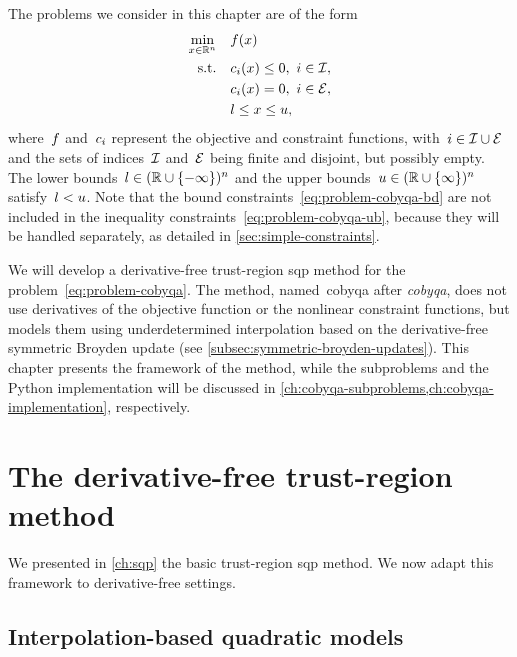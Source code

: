 The problems we consider in this chapter are of the form
\begin{subequations}
    \label{eq:problem-cobyqa}
    \begin{align}
        \min_{\iter \in \R^n}   & \quad \obj(\iter) \label{eq:problem-cobyqa-obj}\\
        \text{s.t.}             & \quad \con{i}(\iter) \le 0, ~ i \in \iub, \label{eq:problem-cobyqa-ub}\\
                                & \quad \con{i}(\iter) = 0, ~ i \in \ieq, \label{eq:problem-cobyqa-eq}\\
                                & \quad \xl \le x \le \xu, \label{eq:problem-cobyqa-bd}
    \end{align}
\end{subequations}
where~$f$ and~$c_{i}$ represent the objective and constraint functions, with~$i \in \mathcal{I} \cup \mathcal{E}$ and the sets of indices~$\mathcal{I}$ and~$\mathcal{E}$ being finite and disjoint, but possibly empty.
The lower bounds~$l \in (\mathbb{R} \cup \{-\infty\})^n$ and the upper bounds~$u \in (\mathbb{R} \cup \{\infty\})^n$ satisfy~$l < u$.
Note that the bound constraints~\cref{eq:problem-cobyqa-bd} are not included in the inequality constraints~\cref{eq:problem-cobyqa-ub}, because they will be handled separately, as detailed in \cref{sec:simple-constraints}.

We will develop a derivative-free trust-region \gls{sqp} method for the problem~\cref{eq:problem-cobyqa}.
The method, named~\gls{cobyqa} after \emph{\glsdesc{cobyqa}}, does not use derivatives of the objective function or the nonlinear constraint functions, but models them using underdetermined interpolation based on the derivative-free symmetric Broyden update (see \cref{subsec:symmetric-broyden-updates}).
This chapter presents the framework of the method, while the subproblems and the Python implementation will be discussed in \cref{ch:cobyqa-subproblems,ch:cobyqa-implementation}, respectively.

\section{The derivative-free trust-region  method}
\label{sec:cobyqa-main}

We presented in \cref{ch:sqp} the basic trust-region \gls{sqp} method.
We now adapt this framework to derivative-free settings.

\subsection{Interpolation-based quadratic models}
\label{subsec:interpolation-based-quadratic-models}

